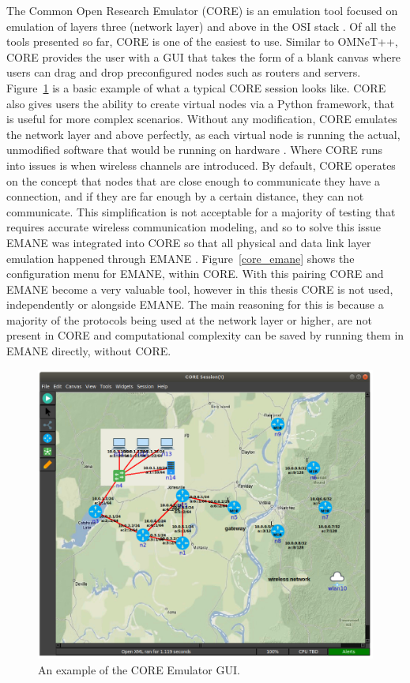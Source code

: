 The Common Open Research Emulator (CORE) is an emulation tool focused on emulation of layers three (network layer) and above in the OSI stack \cite{core}.
Of all the tools presented so far, CORE is one of the easiest to use.
Similar to OMNeT++, CORE provides the user with a GUI that takes the form of a blank canvas where users can drag and drop preconfigured nodes such as routers and servers.
Figure~\ref{core_gui} is a basic example of what a typical CORE session looks like.
CORE also gives users the ability to create virtual nodes via a Python framework, that is useful for more complex scenarios.
Without any modification, CORE emulates the network layer and above perfectly, as each virtual node is running the actual, unmodified software that would be running on hardware \cite{emane_core}.
Where CORE runs into issues is when wireless channels are introduced.
By default, CORE operates on the concept that nodes that are close enough to communicate they have a connection, and if they are far enough by a certain distance, they can not communicate.
This simplification is not acceptable for a majority of testing that requires accurate wireless communication modeling, and so to solve this issue EMANE was integrated into CORE so that all physical and data link layer emulation happened through EMANE \cite{emane_core}.
Figure~\ref{core_emane} shows the configuration menu for EMANE, within CORE.
With this pairing CORE and EMANE become a very valuable tool, however in this thesis CORE is not used, independently or alongside EMANE.
The main reasoning for this is because a majority of the protocols being used at the network layer or higher, are not present in CORE and computational complexity can be saved by running them in EMANE directly, without CORE.\par

\begin{figure}[!ht]
    \centering
    \includegraphics[width=\textwidth,keepaspectratio]{Images/Chpt2/core_gui.png}
    \caption{An example of the CORE Emulator GUI.}
    \label{core_gui}
\end{figure}

